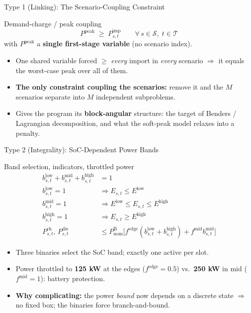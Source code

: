 \documentclass[aspectratio=169]{beamer}
\begin{document}
\begin{frame}{Type 1 (Linking): The Scenario-Coupling Constraint}
\begin{block}{Demand-charge / peak coupling}
\[
P^{\text{peak}} \;\ge\; P^{\text{imp}}_{s,t}
\qquad \forall\, s\in\mathcal{S},\; t\in\mathcal{T}
\]
with $P^{\text{peak}}$ a \textbf{single first-stage variable} (no scenario index).
\end{block}
\begin{itemize}\footnotesize
    \item One shared variable forced $\ge$ \emph{every} import in \emph{every}
          scenario $\Rightarrow$ it equals the worst-case peak over all of them.
    \item \textbf{The only constraint coupling the scenarios:} remove it and the
          $M$ scenarios separate into $M$ independent subproblems.
    \item Gives the program its \textbf{block-angular} structure: the target of
          Benders / Lagrangian decomposition, and what the soft-peak model relaxes
          into a penalty.
\end{itemize}
\end{frame}

\begin{frame}{Type 2 (Integrality): SoC-Dependent Power Bands}
\begin{block}{Band selection, indicators, throttled power}
\begin{align*}
b^{\text{low}}_{s,t} + b^{\text{mid}}_{s,t} + b^{\text{high}}_{s,t} &= 1 \\
b^{\text{low}}_{s,t}=1 &\Rightarrow E_{s,t}\le E^{\text{low}} \\
b^{\text{mid}}_{s,t}=1 &\Rightarrow E^{\text{low}}\le E_{s,t}\le E^{\text{high}} \\
b^{\text{high}}_{s,t}=1 &\Rightarrow E_{s,t}\ge E^{\text{high}} \\
P^{\text{ch}}_{s,t},\,P^{\text{dis}}_{s,t} &\le P^{\text{B}}_{\text{nom}}\big[f^{\text{edge}}(b^{\text{low}}_{s,t}+b^{\text{high}}_{s,t})+f^{\text{mid}}b^{\text{mid}}_{s,t}\big]
\end{align*}
\end{block}
\begin{itemize}\footnotesize
    \item Three binaries select the SoC band; exactly one active per slot.
    \item Power throttled to \textbf{125 kW} at the edges ($f^{\text{edge}}\!=\!0.5$)
          vs.\ \textbf{250 kW} in mid ($f^{\text{mid}}\!=\!1$): battery protection.
    \item \textbf{Why complicating:} the power \emph{bound} now depends on a
          discrete state $\Rightarrow$ no fixed box; the binaries force branch-and-bound.
\end{itemize}
\end{frame}
\end{document}
